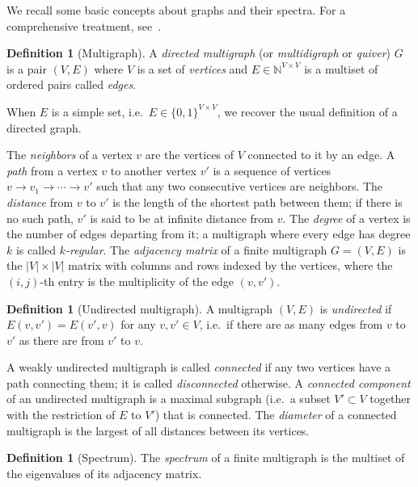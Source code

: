 \documentclass[10pt]{article}
\theoremstyle{plain}
\theoremstyle{definition}
\newtheorem{definition}[theorem]{Definition}
\begin{document}
We recall some basic concepts about graphs and their spectra. %
For a comprehensive treatment,
see~\cite{trevisan-graphs,tao2011expander,Goldreich2011}.

\begin{definition}[Multigraph]
  A \emph{directed multigraph} (or \emph{multidigraph} or \emph{quiver})
  $G$ is a pair $(V,E)$ where $V$ is a set of \emph{vertices} and
  $E∈ℕ^{V×V}$ is a multiset of ordered pairs called \emph{edges}.   
\end{definition}

When $E$ is a simple set, i.e.\ $E∈\{0,1\}^{V×V}$, we recover the
usual definition of a directed graph. %

The \emph{neighbors} of a vertex $v$ are the vertices of $V$ connected
to it by an edge. %
A \emph{path} from a vertex $v$ to another vertex $v'$ is a sequence
of vertices $v\to v_1\to\cdots\to v'$ such that any two consecutive
vertices are neighbors. %
The \emph{distance} from $v$ to $v'$ is the length of the shortest
path between them; if there is no such path, $v'$ is said to be at
infinite distance from $v$. %
The \emph{degree} of a vertex is the number of edges departing from
it; a multigraph where every edge has degree $k$ is called
\emph{$k$-regular}. %
The \emph{adjacency matrix} of a finite multigraph $G=(V,E)$ is the
$|V|×|V|$ matrix with columns and rows indexed by the vertices, where
the $(i,j)$-th entry is the multiplicity of the edge $(v,v')$.

\begin{definition}[Undirected multigraph]
  A multigraph $(V,E)$ is \emph{undirected} if $E(v,v') = E(v',v)$ for
  any $v,v'∈V$, i.e.\ if there are as many edges from $v$ to $v'$ as
  there are from $v'$ to $v$.
\end{definition}

A weakly undirected multigraph is called \emph{connected} if any two
vertices have a path connecting them; it is called \emph{disconnected}
otherwise. %
A \emph{connected component} of an undirected multigraph is a maximal
subgraph (i.e.\ a subset $V'⊂V$ together with the restriction of $E$
to $V'$) that is connected. %
The \emph{diameter} of a connected multigraph is the largest of all
distances between its vertices. %

\begin{definition}[Spectrum]
  The \emph{spectrum} of a finite multigraph is the multiset of the
  eigenvalues of its adjacency matrix.
\end{definition}
\end{document}
